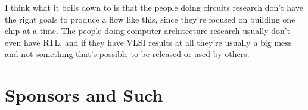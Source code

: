 \documentclass{article}
\begin{document}
I think what it boils down to is that the people doing circuits research
don't have the right goals to produce a flow like this, since they're focused
on building one chip at a time.  The people doing computer architecture
research usually don't even have RTL, and if they have VLSI results at all
they're usually a big mess and not something that's possible to be released
or used by others.

\section{Sponsors and Such}

\end{document}
